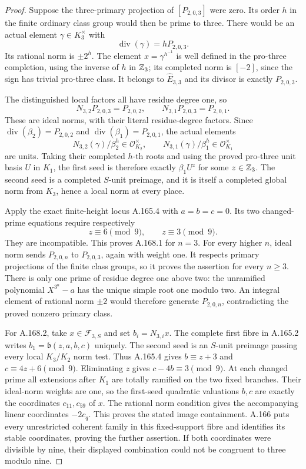 \begin{proof}
Suppose the three-primary projection of \([P_{2,0,3}]\) were zero.
Its order \(h\) in the finite ordinary class group would then be
prime to three.  There would be an actual element
\(\gamma\in K_3^\times\) with
\[
             \operatorname{div}(\gamma)=hP_{2,0,3}.
\tag{A.168.4}
\]
Its rational norm is \(\pm2^h\).  The element
\(x=\gamma^{h^{-1}}\) is well defined in the pro-three completion,
using the inverse of \(h\) in \(\mathbb Z_3\); its completed norm is
\([-2]\), since the sign has trivial pro-three class.
It belongs to \(\widehat E_{3,3}\) and its divisor is exactly
\(P_{2,0,3}\).

The distinguished local factors all have residue degree one, so
\[
 N_{3,2}P_{2,0,3}=P_{2,0,2},\qquad
 N_{3,1}P_{2,0,3}=P_{2,0,1}.
\tag{A.168.5}
\]
These are ideal norms, with their literal residue-degree factors.
Since \(\operatorname{div}(\beta_2)=P_{2,0,2}\) and
\(\operatorname{div}(\beta_1)=P_{2,0,1}\), the actual elements
\[
   N_{3,2}(\gamma)/\beta_2^h\in\mathcal O_{K_2}^{\times},
   \qquad
   N_{3,1}(\gamma)/\beta_1^h\in\mathcal O_{K_1}^{\times}
\tag{A.168.6}
\]
are units.  Taking their completed \(h\)-th roots and using the
proved pro-three unit basis \(U\) in \(K_1\), the first seed is
therefore exactly \(\beta_1U^z\) for some \(z\in\mathbb Z_3\).
The second seed is a completed \(S\)-unit preimage, and it is
itself a completed global norm from \(K_3\), hence a local norm
at every place.

Apply the exact finite-height locus A.165.4 with \(a=b=c=0\).
Its two changed-prime equations require respectively
\[
                        z\equiv6\pmod9,
                  \qquad z\equiv3\pmod9.
\tag{A.168.7}
\]
They are incompatible.  This proves A.168.1 for \(n=3\).
For every higher \(n\), ideal norm sends
\(P_{2,0,n}\) to \(P_{2,0,3}\), again with weight one.
It respects primary projections of the finite class groups,
so it proves the assertion for every \(n\geq3\).
There is only one prime of residue degree one above two:
the unramified polynomial \(X^{3^n}-a\) has the unique simple
root one modulo two.  An integral element of rational norm
\(\pm2\) would therefore generate \(P_{2,0,n}\), contradicting
the proved nonzero primary class.

For A.168.2, take \(x\in\mathcal F_{3,S}\) and set
\(b_i=N_{3,i}x\).  The complete first fibre in A.165.2 writes
\(b_1=\mathfrak b(z,a,b,c)\) uniquely.  The second seed is an
\(S\)-unit preimage passing every local \(K_3/K_2\) norm test.
Thus A.165.4 gives
\(b\equiv z+3\) and \(c\equiv4z+6\pmod9\).
Eliminating \(z\) gives
\(c-4b\equiv3\pmod9\).
At each changed prime all extensions after \(K_1\) are totally
ramified on the two fixed branches.  Their ideal-norm weights are
one, so the first-seed quadratic valuations \(b,c\) are exactly
the coordinates \(c_{11},c_{59}\) of \(x\).  The rational norm
condition gives the accompanying linear coordinates \(-2c_q\).
This proves the stated image containment.  A.166 puts every
unrestricted coherent family in this fixed-support fibre and
identifies its stable coordinates, proving the further assertion.
If both coordinates were divisible by nine, their displayed
combination could not be congruent to three modulo nine.


\end{proof}
